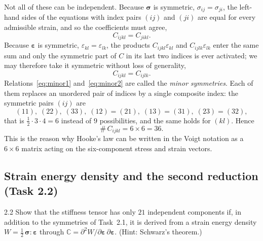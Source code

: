 \documentclass[11pt,a4paper]{article}
\numberwithin{equation}{section}
\theoremstyle{remark}
\newcommand{\bsig}{\bm{\sigma}}
\newcommand{\beps}{\bm{\varepsilon}}
\newcommand{\CC}{\mathbb{C}}
\begin{document}
Not all of these can be independent. Because $\bsig$ is symmetric,
$\sigma_{ij} = \sigma_{ji}$, the left-hand sides of the equations with index pairs $(ij)$
and $(ji)$ are equal for every admissible strain, and so the coefficients must agree,
\begin{equation}\label{eq:minor1}
  C_{ijkl} = C_{jikl}.
\end{equation}
Because $\beps$ is symmetric, $\varepsilon_{kl} = \varepsilon_{lk}$, the products
$C_{ijkl}\varepsilon_{kl}$ and $C_{ijlk}\varepsilon_{lk}$ enter the same sum and only the
symmetric part of $C$ in its last two indices is ever activated; we may therefore take it
symmetric without loss of generality,
\begin{equation}\label{eq:minor2}
  C_{ijkl} = C_{ijlk}.
\end{equation}
Relations~\eqref{eq:minor1} and~\eqref{eq:minor2} are called the \emph{minor symmetries}.
Each of them replaces an unordered pair of indices by a single composite index: the
symmetric pairs $(ij)$ are
\begin{equation*}
  (11),\;(22),\;(33),\;(12)=(21),\;(13)=(31),\;(23)=(32),
\end{equation*}
that is $\tfrac{1}{2}\cdot 3\cdot 4 = 6$ instead of $9$ possibilities, and the same holds
for $(kl)$. Hence
\begin{equation}\label{eq:36}
  \boxed{\;\#\,C_{ijkl} = 6\times 6 = 36.\;}
\end{equation}
This is the reason why Hooke's law can be written in the Voigt notation as a $6\times6$
matrix acting on the six-component stress and strain vectors.

\subsection{Strain energy density and the second reduction (Task 2.2)}\label{sec:21}

\begin{task}{2.2}
  Show that the stiffness tensor has only $21$ independent components if, in addition to
  the symmetries of Task~2.1, it is derived from a strain energy density
  $W = \tfrac{1}{2}\,\bsig:\beps$ through $\CC = \partial^2 W / \partial\beps\,\partial\beps$.
  (Hint: Schwarz's theorem.)
\end{task}
\end{document}
